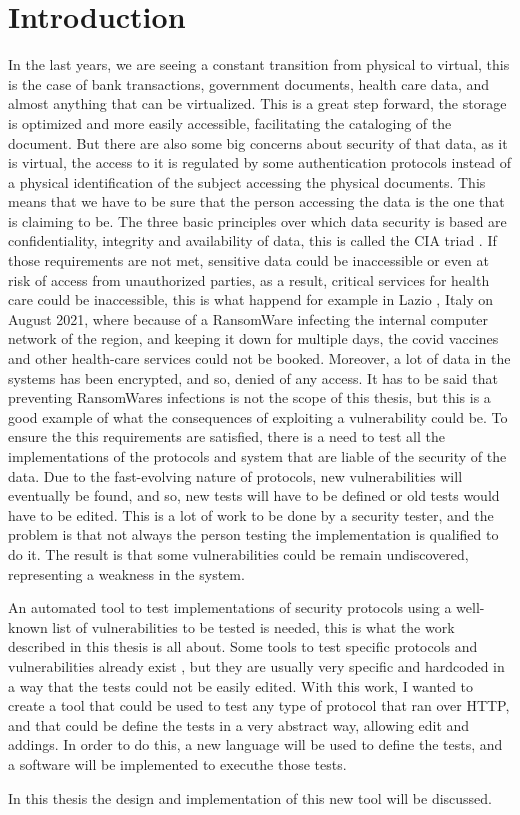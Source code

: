 \chapter{Introduction}
In the last years, we are seeing a constant transition from physical to virtual, this is the case of bank transactions, government documents, health care data, and almost anything that can be virtualized. This is a great step forward, the storage is optimized and more easily accessible, facilitating the cataloging of the document. But there are also some big concerns about security of that data, as it is virtual, the access to it is regulated by some authentication protocols instead of a physical identification of the subject accessing the physical documents. This means that we have to be sure that the person accessing the data is the one that is claiming to be. The three basic principles over which data security is based are confidentiality, integrity and availability of data, this is called the CIA triad \cite{cia_triad}.
If those requirements are not met, sensitive data could be inaccessible or even at risk of access from unauthorized parties, as a result, critical services for health care could be inaccessible, this is what happend for example in Lazio \cite{lazio_hacker_0} \cite{lazio_hacker_1}, Italy on August 2021, where because of a RansomWare infecting the internal computer network of the region, and keeping it down for multiple days, the covid vaccines and other health-care services could not be booked. Moreover, a lot of data in the systems has been encrypted, and so, denied of any access. It has to be said that preventing RansomWares infections is not the scope of this thesis, but this is a good example of what the consequences of exploiting a vulnerability could be.
To ensure the this requirements are satisfied, there is a need to test all the implementations of the protocols and system that are liable of the security of the data. Due to the fast-evolving nature of protocols, new vulnerabilities will eventually be found, and so, new tests will have to be defined or old tests would have to be edited. This is a lot of work to be done by a security tester, and the problem is that not always the person testing the implementation is qualified to do it. The result is that some vulnerabilities could be remain undiscovered, representing a weakness in the system.

An automated tool to test implementations of security protocols using a well-known list of vulnerabilities to be tested is needed, this is what the work described in this thesis is all about. Some tools to test specific protocols and vulnerabilities already exist \cite{wendy_barreto}\cite{claudio_grisenti}, but they are usually very specific and hardcoded in a way that the tests could not be easily edited. With this work, I wanted to create a tool that could be used to test any type of protocol that ran over HTTP, and that could be define the tests in a very abstract way, allowing edit and addings. In order to do this, a new language will be used to define the tests, and a software will be implemented to executhe those tests.

In this thesis the design and implementation of this new tool will be discussed.

